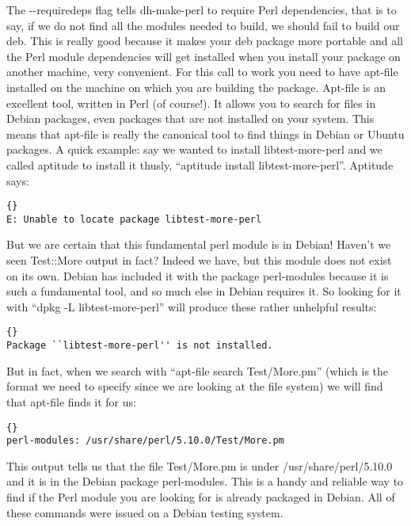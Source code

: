 The {-}{-}requiredeps f\hbox{}lag tells dh-make-perl to require Perl dependencies, that
is to say, if we do not f\hbox{}ind all the modules needed to build, we should fail to
build our deb. This is really good because it makes your deb package more
portable and all the Perl module dependencies will get installed when you
install your package on another machine, very convenient. For this call to work
you need to have apt-f\hbox{}ile installed on the machine on which you are building the
package. Apt-f\hbox{}ile is an excellent tool, written in Perl (of course!). It allows
you to search for f\hbox{}iles in Debian packages, even packages that are not installed
on your system. This means that apt-f\hbox{}ile is really the canonical tool to f\hbox{}ind
things in Debian or Ubuntu packages. A quick example: say we wanted to install
libtest-more-perl and we called aptitude to install it thusly, ``aptitude
install libtest-more-perl''. Aptitude says:

\begin{lstlisting}[frame=trbl,label=cl:debs_cpan:apt-install,caption=aptitude install libtest-more-perl output]{}
E: Unable to locate package libtest-more-perl
\end{lstlisting}

But we are certain that this fundamental perl module is in Debian! Haven't we
seen Test::More output in fact? Indeed we have, but this module does not exist
on its own. Debian has included it with the package perl-modules because it is
such a fundamental tool, and so much else in Debian requires it. So looking for
it with ``dpkg -L libtest-more-perl'' will produce these rather unhelpful
results:

\begin{lstlisting}[frame=trbl,label=cl:debs_cpan:dpkg-search,caption=dpkg -L libtest-more-perl output]{}
Package ``libtest-more-perl'' is not installed.
\end{lstlisting}

But in fact, when we search with ``apt-f\hbox{}ile search Test/More.pm'' (which is the
format we need to specify since we are looking at the f\hbox{}ile system) we will f\hbox{}ind
that apt-f\hbox{}ile f\hbox{}inds it for us:

\begin{lstlisting}[frame=trbl,label=cl:debs_cpan:apt-file,caption=apt-file search Test/More.pm output]{}
perl-modules: /usr/share/perl/5.10.0/Test/More.pm
\end{lstlisting}

This output tells us that the f\hbox{}ile Test/More.pm is under /usr/share/perl/5.10.0
and it is in the Debian package perl-modules. This is a handy and reliable way
to f\hbox{}ind if the Perl module you are looking for is already packaged in Debian.
All of these commands were issued on a Debian testing system.


